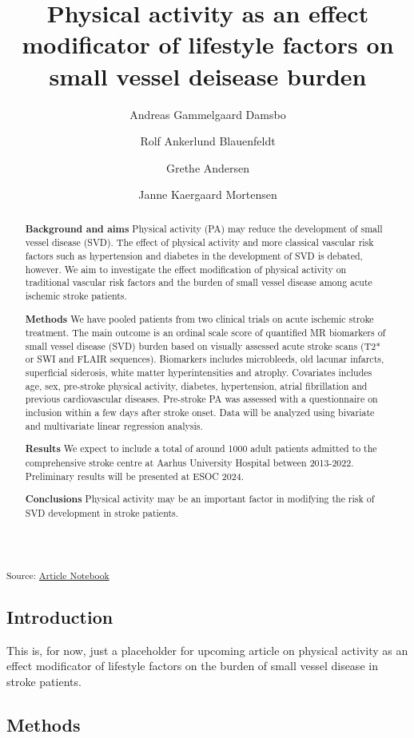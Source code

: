 \documentclass[
  letterpaper,
  DIV=11,
  numbers=noendperiod]{scrartcl}
\title{Physical activity as an effect modificator of lifestyle factors
on small vessel deisease burden}
\author{Andreas Gammelgaard Damsbo \and Rolf Ankerlund
Blauenfeldt \and Grethe Andersen \and Janne Kaergaard Mortensen}
\date{}
\begin{document}
\maketitle
\begin{abstract}
\textbf{Background and aims} Physical activity (PA) may reduce the
development of small vessel disease (SVD). The effect of physical
activity and more classical vascular risk factors such as hypertension
and diabetes in the development of SVD is debated, however. We aim to
investigate the effect modification of physical activity on traditional
vascular risk factors and the burden of small vessel disease among acute
ischemic stroke patients.

\textbf{Methods} We have pooled patients from two clinical trials on
acute ischemic stroke treatment. The main outcome is an ordinal scale
score of quantified MR biomarkers of small vessel disease (SVD) burden
based on visually assessed acute stroke scans (T2* or SWI and FLAIR
sequences). Biomarkers includes microbleeds, old lacunar infarcts,
superficial siderosis, white matter hyperintensities and atrophy.
Covariates includes age, sex, pre-stroke physical activity, diabetes,
hypertension, atrial fibrillation and previous cardiovascular diseases.
Pre-stroke PA was assessed with a questionnaire on inclusion within a
few days after stroke onset. Data will be analyzed using bivariate and
multivariate linear regression analysis.

\textbf{Results} We expect to include a total of around 1000 adult
patients admitted to the comprehensive stroke centre at Aarhus
University Hospital between 2013-2022. Preliminary results will be
presented at ESOC 2024.

\textbf{Conclusions} Physical activity may be an important factor in
modifying the risk of SVD development in stroke patients.
\end{abstract}

\textsubscript{Source:
\href{https://agdamsbo.github.io/svd-modification/index.qmd.html}{Article
Notebook}}

\subsection{Introduction}\label{introduction}

This is, for now, just a placeholder for upcoming article on physical
activity as an effect modificator of lifestyle factors on the burden of
small vessel disease in stroke patients.

\subsection{Methods}\label{methods}
\end{document}
